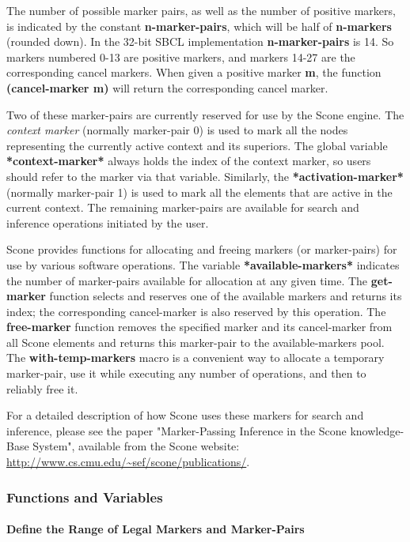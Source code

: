 \documentclass[titlepage,twoside,openright,11pt]{article}
\begin{document}
The number of possible marker pairs, as well as the number of positive
markers, is indicated by the constant \textbf{n-marker-pairs}, which
will be half of \textbf{n-markers} (rounded down). In the 32-bit SBCL
implementation \textbf{n-marker-pairs} is 14. So markers numbered 0-13
are positive markers, and markers 14-27 are the corresponding cancel
markers. When given a positive marker \textbf{m}, the function
\textbf{(cancel-marker m)} will return the corresponding cancel marker.

Two of these marker-pairs are currently reserved for use by the Scone
engine. The \emph{context marker} (normally marker-pair 0) is used to
mark all the nodes representing the currently active context and its
superiors. The global variable \textbf{*context-marker*} always holds
the index of the context marker, so users should refer to the marker via
that variable. Similarly, the \textbf{*activation-marker*} (normally
marker-pair 1) is used to mark all the elements that are active in the
current context. The remaining marker-pairs are available for search and
inference operations initiated by the user.

Scone provides functions for allocating and freeing markers (or
marker-pairs) for use by various software operations. The variable
\textbf{*available-markers*} indicates the number of marker-pairs
available for allocation at any given time. The \textbf{get-marker}
function selects and reserves one of the available markers and returns
its index; the corresponding cancel-marker is also reserved by this
operation. The \textbf{free-marker} function removes the specified
marker and its cancel-marker from all Scone elements and returns this
marker-pair to the available-markers pool. The
\textbf{with-temp-markers} macro is a convenient way to allocate a
temporary marker-pair, use it while executing any number of operations,
and then to reliably free it.

For a detailed description of how Scone uses these markers for search
and inference, please see the paper "Marker-Passing Inference in the
Scone knowledge-Base System", available from the Scone website:
\url{http://www.cs.cmu.edu/~sef/scone/publications/}.

\subsubsection{Functions and Variables}\label{functions-and-variables-4}

\paragraph{Define the Range of Legal Markers and
Marker-Pairs}\label{define-the-range-of-legal-markers-and-marker-pairs}
\end{document}
